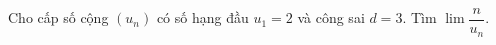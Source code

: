 \begin{ex}
Cho cấp số cộng $(u_n)$ có số hạng đầu $u_1=2$ và công sai $d=3$. Tìm $\lim\dfrac n{u_n}$.
\end{ex}
